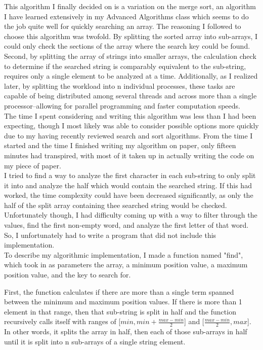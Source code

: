 \documentclass[12pt, a4paper]{article}
\begin{document}
This algorithm I finally decided on is a variation on the merge sort, an algorithm I have learned extensively in my Advanced Algorithms class which seems to do the job quite well for quickly searching an array.  The reasoning I followed to choose this algorithm was twofold.  By splitting the sorted array into sub-arrays, I could only check the sections of the array where the search key could be found.  Second, by splitting the array of strings into smaller arrays, the calculation check to determine if the searched string is  comparably equivalent to the sub-string, requires only a single element to be analyzed at a time.  Additionally, as I realized later, by splitting the workload into n individual processes, these tasks are capable of being distributed among several threads and across more than a single processor--allowing for parallel programming and faster computation speeds.\\

The time I spent considering and writing this algorithm was less than I had been expecting, though I most likely was able to consider possible options more quickly due to my having recently reviewed search and sort algorithms.  From the time I started and the time I finished writing my algorithm on paper, only fifteen minutes had transpired, with most of it taken up in actually writing the code on my piece of paper.  \\

I tried to find a way to analyze the first character in each sub-string to only split it into and analyze the half which would contain the searched string.  If this had worked, the time complexity could have been decreased significantly, as only the half of the split array containing thee searched string would be checked.  Unfortunately though, I had difficulty coming up with a way to filter through the values, find the first non-empty word, and analyze the first letter of that word.  So, I unfortunately had to write a program that did not include this implementation. \\

To describe my algorithmic implementation, I made a function named "find", which took in as parameters the array, a minimum position value, a maximum position value, and the key to search for.  

First, the function calculates if there are more than a single term spanned between the minimum and maximum position values.  If there is more than 1 element in that range, then that sub-string is split in half and the function recursively calls itself with ranges of [\(min, min+\frac{max-min}{2}\)] and [\(\frac{max-min}{2}, max\)].  In other words, it splits the array in half, then each of those sub-arrays in half until it is split into n sub-arrays of a single string element. 
\end{document}
